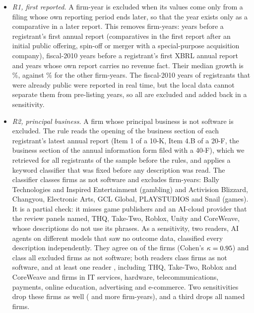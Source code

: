 \begin{itemize}
\item \emph{R1, first reported.} A firm-year is excluded when its values come only from a filing whose own reporting period ends later, so that the year exists only as a comparative in a later report. This removes \VRone{} firm-years: \VRoneIpo{} years before a registrant's first annual report (comparatives in the first report after an initial public offering, spin-off or merger with a special-purpose acquisition company), \VRoneTen{} fiscal-2010 years before a registrant's first XBRL annual report and \VRoneLate{} years whose own report carries no revenue fact. Their median growth is \VRoneGrowth\%, against \VRoneGrowthOther\% for the other firm-years. The fiscal-2010 years of registrants that were already public were reported in real time, but the local data cannot separate them from pre-listing years, so all are excluded and added back in a sensitivity.
\item \emph{R2, principal business.} A firm whose principal business is not software is excluded. The rule reads the opening of the business section of each registrant's latest annual report (Item 1 of a 10-K, Item 4.B of a 20-F, the business section of the annual information form filed with a 40-F), which we retrieved for all \VRtwoDescribed{} registrants of the sample before the rules, and applies a keyword classifier that was fixed before any description was read. The classifier classes \VRtwoClassFirms{} firms as not software and excludes \VRtwoExclN{} firm-years: Bally Technologies and Inspired Entertainment (gambling) and Activision Blizzard, Changyou, Electronic Arts, GCL Global, PLAYSTUDIOS and Snail (games). It is a partial check: it misses game publishers and an AI-cloud provider that the review panels named, THQ, Take-Two, Roblox, Unity and CoreWeave, whose descriptions do not use its phrases. As a sensitivity, two readers, AI agents on different models that saw no outcome data, classified every description independently. They agree on \VRtwoReadAgree{} of the \VRtwoReadN{} firms (Cohen's $\kappa=0.95$) and class all \VRtwoClassFirms{} excluded firms as not software; both readers class \VRtwoReadBoth{} firms as not software, and at least one reader \VRtwoReadEither, including THQ, Take-Two, Roblox and CoreWeave and firms in IT services, hardware, telecommunications, payments, online education, advertising and e-commerce. Two sensitivities drop these firms as well (\VRtwoBothN{} and \VRtwoEitherN{} more firm-years), and a third drops all \VRtwoFirms{} named firms.

\end{itemize}
